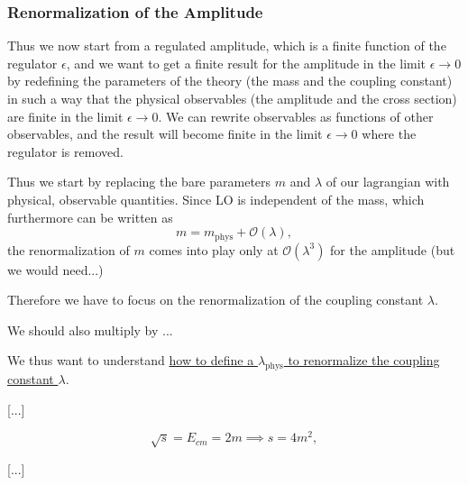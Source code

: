 \subsubsection{Renormalization of the Amplitude}

Thus we now start from a regulated amplitude, which is a finite function of the regulator \(\epsilon\), and we want to get a finite result for the amplitude in the limit \(\epsilon \to 0\) by redefining the parameters of the theory (the mass and the coupling constant) in such a way that the physical observables (the amplitude and the cross section) are finite in the limit \(\epsilon \to 0\). We can rewrite observables as functions of other observables, and the result will become finite in the limit \(\epsilon \to 0\) where the regulator is removed.

Thus we start by replacing the bare parameters \(m\) and \(\lambda\) of our lagrangian with physical, observable quantities. Since LO is independent of the mass, which furthermore can be written as
\[
    m = m_{\text{phys}} + \mathcal{O}(\lambda),
\]
the renormalization of \(m\) comes into play only at \(\mathcal{O}(\lambda^3)\) for the amplitude (but we would need...)

Therefore we have to focus on the renormalization of the coupling constant \(\lambda\).
\begin{remark}
    We should also multiply by ...
\end{remark}

We thus want to understand \uline{how to define a \(\lambda_{\text{phys}}\) to renormalize the coupling constant \(\lambda\)}.

[...]

\[
    \sqrt{s} = E_{cm} = 2m \implies s = 4 m^2,
\]

[...]

